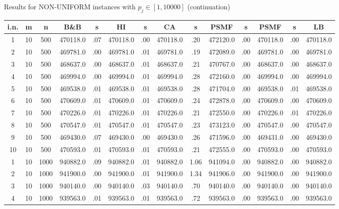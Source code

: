 \documentclass[12pt,a4paper]{article}
\begin{document}
\begin{center}
{\footnotesize  Results for NON-UNIFORM instances with $p_j \in
[1,10000]$ (continuation)} {\tiny
\begin{tabular}{|ccc|cc|cc|cc|cc|cc|c|}\hline
{\bf i.n.}&{\bf m}&{\bf n}&{\bf B\&B}&{\bf s}&{\bf HI}&{\bf s}&{\bf
CA}&{\bf s}&{\bf PSMF}&{\bf s}&{\bf PSMF}&{\bf s}&{\bf LB}
\\\hline
1             &  10& 500& 470118.0&  .07& 470118.0&  .00& 470118.0&  .20& 472120.0&  .00& 470118.0&  .00& 470118.0\\[-0.01in]
2             &  10& 500& 469781.0&  .00& 469781.0&  .01& 469781.0&  .19& 472089.0&  .00& 469781.0&  .00& 469781.0\\[-0.01in]
3             &  10& 500& 468637.0&  .00& 468637.0&  .01& 468637.0&  .21& 470767.0&  .00& 468637.0&  .00& 468637.0\\[-0.01in]
4             &  10& 500& 469994.0&  .00& 469994.0&  .01& 469994.0&  .28& 472160.0&  .00& 469994.0&  .00& 469994.0\\[-0.01in]
5             &  10& 500& 469538.0&  .01& 469538.0&  .01& 469538.0&  .28& 471704.0&  .00& 469538.0&  .01& 469538.0\\[-0.01in]
6             &  10& 500& 470609.0&  .01& 470609.0&  .01& 470609.0&  .24& 472878.0&  .00& 470609.0&  .00& 470609.0\\[-0.01in]
7             &  10& 500& 470226.0&  .01& 470226.0&  .01& 470226.0&  .21& 472550.0&  .00& 470226.0&  .01& 470226.0\\[-0.01in]
8             &  10& 500& 470547.0&  .01& 470547.0&  .01& 470547.0&  .23& 473123.0&  .00& 470547.0&  .00& 470547.0\\[-0.01in]
9             &  10& 500& 469430.0&  .07& 469430.0&  .00& 469430.0&  .26& 471596.0&  .00& 469431.0&  .00& 469430.0\\[-0.01in]
10            &  10& 500& 470593.0&  .01& 470593.0&  .01& 470593.0&  .21& 472555.0&  .00& 470593.0&  .00& 470593.0\\[-0.01in]
1             &  10&1000& 940882.0&  .09& 940882.0&  .01& 940882.0& 1.06& 941094.0&  .00& 940882.0&  .00& 940882.0\\[-0.01in]
2             &  10&1000& 941900.0&  .00& 941900.0&  .01& 941900.0& 1.34& 941906.0&  .00& 941900.0&  .00& 941900.0\\[-0.01in]
3             &  10&1000& 940140.0&  .00& 940140.0&  .03& 940140.0&  .70& 940140.0&  .00& 940140.0&  .00& 940140.0\\[-0.01in]
4             &  10&1000& 939563.0&  .01& 939563.0&  .01& 939563.0&  .72& 939563.0&  .00& 939563.0&  .00& 939563.0\\[-0.01in]

\end{tabular}}
\end{center}
\end{document}
